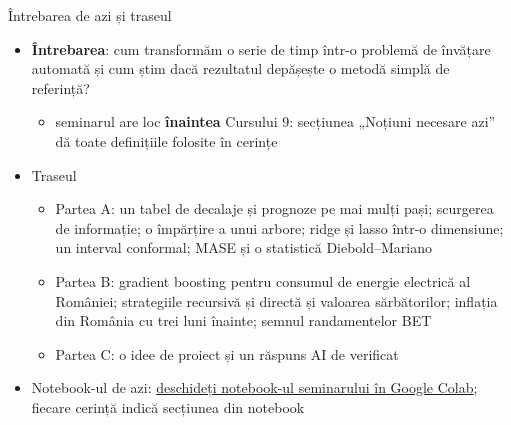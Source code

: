 \begin{frame}{Întrebarea de azi și traseul}
\itemsize{\small}
\begin{itemize}
    \item \textbf{Întrebarea}: cum transformăm o serie de timp într-o problemă de învățare automată și cum știm dacă rezultatul depășește o metodă simplă de referință?
    \begin{itemize}
        \item seminarul are loc \textbf{înaintea} Cursului 9: secțiunea „Noțiuni necesare azi” dă toate definițiile folosite în cerințe
    \end{itemize}
    \item Traseul
    \begin{itemize}
        \item Partea A: un tabel de decalaje și prognoze pe mai mulți pași; scurgerea de informație; o împărțire a unui arbore; ridge și lasso într-o dimensiune; un interval conformal; MASE și o statistică Diebold--Mariano
        \item Partea B: gradient boosting pentru consumul de energie electrică al României; strategiile recursivă și directă și valoarea sărbătorilor; inflația din România cu trei luni înainte; semnul randamentelor BET
        \item Partea C: o idee de proiect și un răspuns AI de verificat
    \end{itemize}
    \item Notebook-ul de azi: \href{\nb}{deschideți notebook-ul seminarului în Google Colab}; fiecare cerință indică secțiunea din notebook
\end{itemize}
\end{frame}

